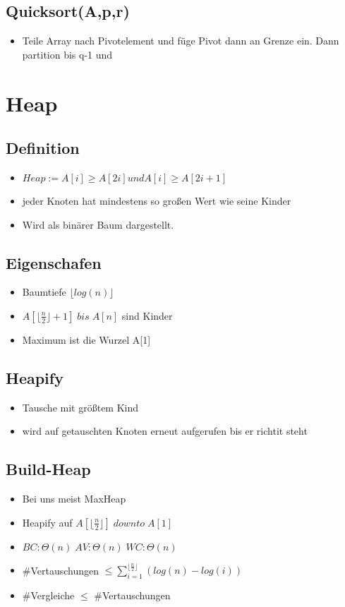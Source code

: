 \documentclass{article}
\begin{document}
\subsection{Quicksort(A,p,r)}
\begin{itemize}
\item Teile Array nach Pivotelement und f{\"u}ge Pivot dann an Grenze ein. Dann partition bis q-1 und 
\end{itemize}

\section{Heap}
\subsection{Definition}

\begin{itemize}
\item $ Heap := A[i] \geq A[2i] und A[i] \geq A[2i+1]$ \\
\item jeder Knoten hat mindestens so gro\ss en Wert wie seine Kinder \\
\item Wird als bin{\"a}rer Baum dargestellt. \newline
\end{itemize}

\subsection{Eigenschafen}
\begin{itemize}
\item Baumtiefe $\lfloor log(n)\rfloor$
\item $A[\lfloor \frac{n}{2} \rfloor +1] \; bis \; A[n]$ sind Kinder
\item Maximum ist die Wurzel A[1]
\end{itemize}
\subsection{Heapify}
\begin{itemize}
\item Tausche mit gr{\"o}\ss tem Kind
\item wird auf getauschten Knoten erneut aufgerufen bis er richtit steht
\end{itemize}
\subsection{Build-Heap}
\begin{itemize}
\item Bei uns meist MaxHeap
\item Heapify auf $A[\lfloor \frac{n}{2} \rfloor] \; downto  \;A[1]$
\item $BC: \Theta(n)\; AV:\Theta(n)\; WC: \Theta(n)\;$
\item \#Vertauschungen $\leq \sum_{i=1}^{\lfloor \frac{n}{2} \rfloor} (log(n) -log(i))$
\item \#Vergleiche $\leq$ \#Vertauschungen
\end{itemize}
\end{document}
